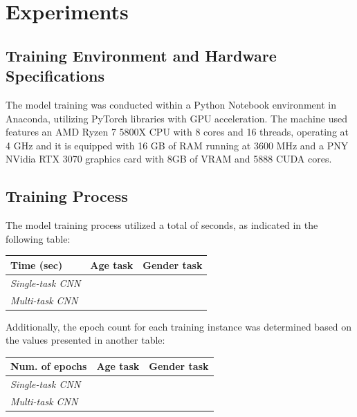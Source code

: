 \section{Experiments} \label{sec:experiments}

\subsection{Training Environment and Hardware Specifications}

The model training was conducted within a Python Notebook environment
in Anaconda, utilizing PyTorch libraries with GPU acceleration.
The machine used features an AMD Ryzen 7 5800X CPU with 8 cores and
16 threads, operating at 4 GHz and
it is equipped with 16 GB of RAM running at 3600 MHz
and a PNY NVidia RTX 3070 graphics card with 8GB
of VRAM and 5888 CUDA cores.

\subsection{Training Process}

The model training process utilized a total of seconds,
as indicated in the following table:
\begin{table}[H]
    \centering
    \begin{tabular}{@{}lll@{}}
    \toprule
    Time (sec)               & \textbf{Age task} & \textbf{Gender task} \\ \midrule
    \textit{Single-task CNN} &                   &                      \\
    \textit{Multi-task CNN}  &                   &                      \\ \bottomrule
    \end{tabular}
\end{table}

Additionally, the epoch count for each training instance was
determined based on the values presented in another table:
\begin{table}[H]
    \centering
    \begin{tabular}{@{}lll@{}}
    \toprule
    Num. of epochs           & \textbf{Age task} & \textbf{Gender task} \\ \midrule
    \textit{Single-task CNN} &                   &                      \\
    \textit{Multi-task CNN}  &                   &                      \\ \bottomrule
    \end{tabular}
\end{table}

